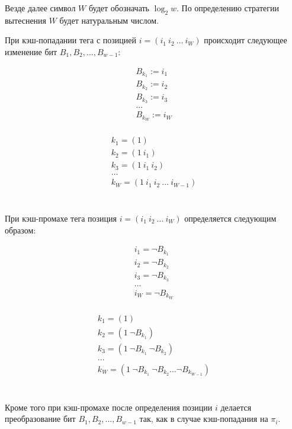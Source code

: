 Везде далее символ $W$ будет обозначать $\log_2 w$. По определению
стратегии вытеснения \PseudoLRU $W$ будет натуральным числом.

\begin{utv}\label{wMinus1PseudoLRU}При кэш-попадании тега с позицией
$i = (i_1~i_2~\dots~i_W)$ происходит следующее изменение бит $B_1,
B_2, ..., B_{w{-}1}$:

\parbox{0.3\textwidth}{
  $$ \begin{array}{l}
  B_{k_1} := i_1 \\
  B_{k_2} := i_2 \\
  B_{k_3} := i_3 \\
  ...\\
  B_{k_W} := i_W \\
  \end{array}$$
} \vline
\parbox{0.7\textwidth}{
  $$ \begin{array}{l}
  k_1 = (1) \\
  k_2 = (1~i_1) \\
  k_3 = (1~i_1~i_2) \\
  ...\\
  k_W = (1~i_1~i_2~\dots~i_{W{-}1}) \\
  \end{array} $$
}
\\[1cm]

При кэш-промахе тега позиция $i = (i_1~i_2~\dots~i_W)$ определяется
следующим образом:

\parbox{0.3\textwidth}{
  $$ \begin{array}{l}
  i_1 = \neg B_{k_1} \\
  i_2 = \neg B_{k_2} \\
  i_3 = \neg B_{k_3} \\
  ...\\
  i_W = \neg B_{k_W} \\
  \end{array}$$
} \vline
\parbox{0.7\textwidth}{
  $$ \begin{array}{l}
  k_1 = (1) \\
  k_2 = (1~\neg B_{k_1}) \\
  k_3 = (1~\neg B_{k_1}~\neg B_{k_2}) \\
  ...\\
  k_W = (1~\neg B_{k_1}~\neg B_{k_2}\dots\neg B_{k_{W{-}1}}) \\
  \end{array} $$
}
\\[0.5cm]

Кроме того при кэш-промахе после определения позиции $i$ делается
преобразование бит $B_1, B_2, ..., B_{w{-}1}$ так, как в случае
кэш-попадания на $\pi_i$.
\end{utv}

